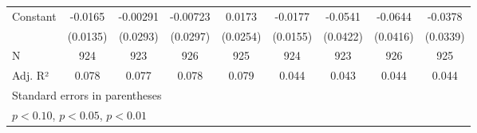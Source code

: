{\begin{tabular}{l*{8}{c}}
Constant            &     -0.0165         &    -0.00291         &    -0.00723         &      0.0173         &     -0.0177         &     -0.0541         &     -0.0644         &     -0.0378         \\
                    &    (0.0135)         &    (0.0293)         &    (0.0297)         &    (0.0254)         &    (0.0155)         &    (0.0422)         &    (0.0416)         &    (0.0339)         \\
\hline
N                   &         924         &         923         &         926         &         925         &         924         &         923         &         926         &         925         \\
Adj. R²             &       0.078         &       0.077         &       0.078         &       0.079         &       0.044         &       0.043         &       0.044         &       0.044         \\
\hline\hline
\multicolumn{9}{l}{\footnotesize Standard errors in parentheses}\\
\multicolumn{9}{l}{\footnotesize \sym{*} \(p<0.10\), \sym{**} \(p<0.05\), \sym{***} \(p<0.01\)}\\
\end{tabular}
}
